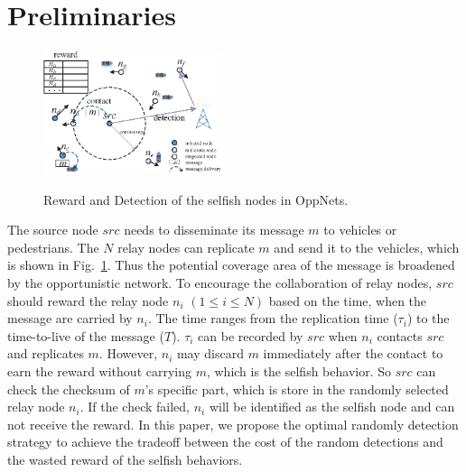 \section{Preliminaries}
\label{sec:preli}
\begin{figure}
  \centering
  {\includegraphics[width=0.47\textwidth]{fig/sketch.eps}}
     \caption{Reward and Detection of the selfish nodes in OppNets.}
     \label{fig:sketch}
\end{figure}
The source node $src$ needs to disseminate its message $m$
to vehicles or pedestrians.
The $N$ relay nodes can replicate $m$
and send it to the vehicles,
which is shown in Fig.~\ref{fig:sketch}.
Thus the potential coverage area of the message is broadened
by the opportunistic network.
To encourage the collaboration of relay nodes,
$src$ should reward the relay node $n_{i}$
$(1 \le i \le N)$ based on the time,
when the message are carried by $n_{i}$.
The time ranges from the replication time ($\tau_{i}$)
to the time-to-live of the message ($T$).
$\tau_{i}$ can be recorded by $src$ when
$n_{i}$ contacts $src$ and replicates $m$.
However, $n_{i}$ may discard $m$ immediately after the contact
to earn the reward without carrying $m$,
which is the selfish behavior.
So $src$ can check the checksum of $m$'s specific part,
which is store in the randomly selected relay node $n_{i}$.
If the check failed,
$n_{i}$ will be identified as the selfish node
and can not receive the reward.
In this paper, we propose the optimal randomly detection strategy
to achieve the tradeoff between
the cost of the random detections and
the wasted reward of the selfish behaviors.

